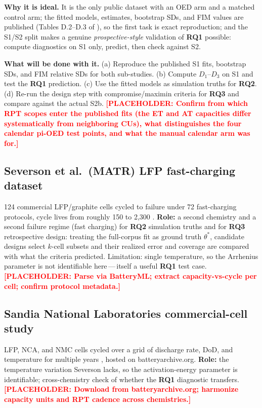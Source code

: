 \documentclass[11pt,letterpaper]{article}
\newcommand{\dash}{\,---\,}
\newcommand{\ph}[1]{\textcolor{red}{\textbf{[PLACEHOLDER: #1]}}}
\newcommand{\RQ}[1]{\textbf{RQ#1}}
\begin{document}
\textbf{Why it is ideal.} It is the only public dataset with an OED arm and a matched control arm; the fitted models, estimates, bootstrap SDs, and FIM values are published (Tables D.2--D.3 of \cite{stroebl2026}), so the first task is exact reproduction; and the S1/S2 split makes a genuine \emph{prospective-style} validation of \RQ1 possible: compute diagnostics on S1 only, predict, then check against S2.

\textbf{What will be done with it.} (a) Reproduce the published S1 fits, bootstrap SDs, and FIM relative SDs for both sub-studies. (b) Compute $D_1$--$D_3$ on S1 and test the \RQ1 prediction. (c) Use the fitted models as simulation truths for \RQ2. (d) Re-run the design step with compromise/maximin criteria for \RQ3 and compare against the actual S2b. \ph{Confirm from \cite{stroebl2024,stroebl2026} which RPT scopes enter the published fits (the ET and AT capacities differ systematically from neighboring CUs), what distinguishes the four calendar pi-OED test points, and what the manual calendar arm was for.}

\subsection{Severson et al.\ (MATR) LFP fast-charging dataset}
124 commercial LFP/graphite cells cycled to failure under 72 fast-charging protocols, cycle lives from roughly 150 to 2{,}300 \cite{severson2019}. \textbf{Role:} a second chemistry and a second failure regime (fast charging) for \RQ2 simulation truths and for \RQ3 retrospective design: treating the full-corpus fit as ground truth $\theta^*$, candidate designs select $k$-cell subsets and their realized error and coverage are compared with what the criteria predicted. Limitation: single temperature, so the Arrhenius parameter is not identifiable here\dash itself a useful \RQ1 test case. \ph{Parse via BatteryML; extract capacity-vs-cycle per cell; confirm protocol metadata.}

\subsection{Sandia National Laboratories commercial-cell study}
LFP, NCA, and NMC cells cycled over a grid of discharge rate, DoD, and temperature for multiple years \cite{preger2020}, hosted on batteryarchive.org. \textbf{Role:} the temperature variation Severson lacks, so the activation-energy parameter is identifiable; cross-chemistry check of whether the \RQ1 diagnostic transfers. \ph{Download from batteryarchive.org; harmonize capacity units and RPT cadence across chemistries.}
\end{document}
